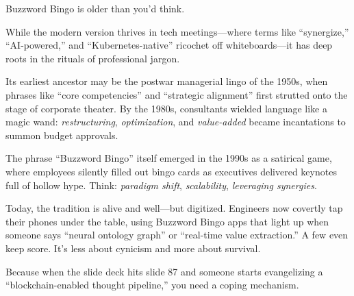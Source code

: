 \begin{tcolorbox}[title=Historical Sidenote: The Ancient Art of Buzzword Bingo, colback=gray!5, colframe=black, fonttitle=\bfseries]
  Buzzword Bingo is older than you'd think.

  \medskip
  
  While the modern version thrives in tech meetings—where terms like “synergize,” “AI-powered,” and “Kubernetes-native” ricochet off whiteboards—it has deep roots in the rituals of professional jargon.

  \medskip
  
  Its earliest ancestor may be the postwar managerial lingo of the 1950s, when phrases like “core competencies” and “strategic alignment” first strutted onto the stage of corporate theater. By the 1980s, consultants wielded language like a magic wand: \textit{restructuring}, \textit{optimization}, and \textit{value-added} became incantations to summon budget approvals.

  \medskip
  
  The phrase “Buzzword Bingo” itself emerged in the 1990s as a satirical game, where employees silently filled out bingo cards as executives delivered keynotes full of hollow hype. Think: \textit{paradigm shift}, \textit{scalability}, \textit{leveraging synergies}.

  \medskip
  
  Today, the tradition is alive and well—but digitized. Engineers now covertly tap their phones under the table, using Buzzword Bingo apps that light up when someone says “neural ontology graph” or “real-time value extraction.” A few even keep score. It's less about cynicism and more about survival.

  \medskip
  
  Because when the slide deck hits slide 87 and someone starts evangelizing a “blockchain-enabled thought pipeline,” you need a coping mechanism.
\end{tcolorbox}
  